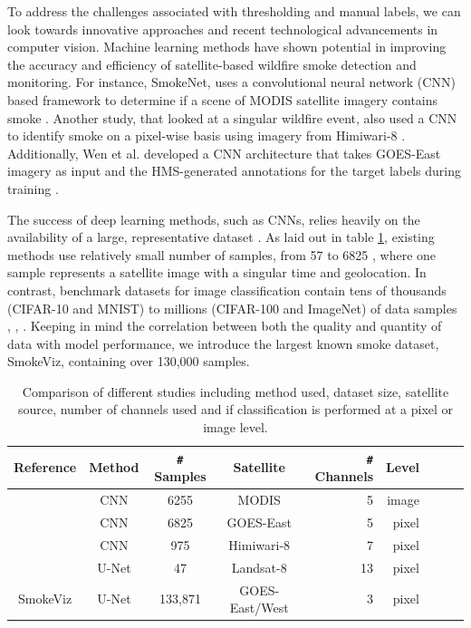 \documentclass{article}
\begin{document}
To address the challenges associated with thresholding and manual labels, we can look towards innovative approaches and recent technological advancements in computer vision. Machine learning methods have shown potential in improving the accuracy and efficiency of satellite-based wildfire smoke detection and monitoring. For instance, SmokeNet, uses a convolutional neural network (CNN) based framework to determine if a scene of MODIS satellite imagery contains smoke \cite{smokenet}. Another study, that looked at a singular wildfire event, also used a CNN to identify smoke on a pixel-wise basis using imagery from Himiwari-8 \cite{larsen}. Additionally, Wen et al. developed a CNN architecture that takes GOES-East imagery as input and the HMS-generated annotations for the target labels during training \cite{smoke_goes}. 

The success of deep learning methods, such as CNNs, relies heavily on the availability of a large, representative dataset \cite{data_size}. As laid out in table \ref{studies}, existing methods use relatively small number of samples, from 57 \cite{wang} to 6825 \cite{smoke_goes}, where one sample represents a satellite image with a singular time and geolocation. In contrast, benchmark datasets for image classification contain tens of thousands (CIFAR-10 and MNIST) to millions (CIFAR-100 and ImageNet) of data samples \cite{cifar}, \cite{mnist}, \cite{imgnet}. Keeping in mind the correlation between both the quality and quantity of data with model performance, we introduce the largest known smoke dataset, SmokeViz, containing over 130,000 samples.

\begin{table}[h]
    \caption{Comparison of different studies including method used, dataset size, satellite source, number of channels used and if classification is performed at a pixel or image level.}\label{studies}
    \centering
    \begin{tabular}{ccccrrcrc}
        \toprule
        Reference & Method & \verb|#| Samples & Satellite & \verb|#| Channels & Level\\
        \midrule
        \cite{smokenet}& CNN & 6255 & MODIS & 5 & image\\
        \cite{smoke_goes}& CNN & 6825 & GOES-East & 5 & pixel\\
        \cite{larsen} & CNN & 975 & Himiwari-8 & 7 & pixel\\
        \cite{wang}& U-Net & 47 & Landsat-8 & 13 & pixel\\
        SmokeViz  & U-Net & 133,871 & GOES-East/West & 3 & pixel\\
        \bottomrule
    \end{tabular}
\end{table}
\end{document}
